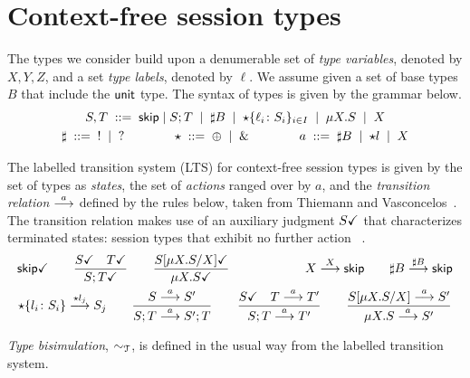\section{Context-free session types}
\label{sec:contextfreesession}

The types we consider build upon a denumerable set of \emph{type
  variables}, denoted by $X,Y,Z$, and a set \emph{type labels},
denoted by $\ell$. We assume given a set of base types $B$ that
include the $\unitk$ type. The syntax of types is given by the grammar
below.
%
\begin{gather*}
  S,T \grmeq \skipk \mid S;T \grmor \sharp B \grmor 
  \star\{\ell_i\colon S_i\}_{i\in I} \grmor \mu X.S \grmor X
  \\
  \sharp \grmeq {}! \grmor {}? 
  \qquad \qquad
  \star  \grmeq \oplus \grmor {}\&
  \qquad \qquad
  a \grmeq \sharp B \grmor \star l \grmor X
\end{gather*}

%
The labelled transition system (LTS) for context-free session types is
given by the set of types as \emph{states}, the set of \emph{actions}
ranged over by $a$, and the \emph{transition relation} $\LTSderives$
defined by the rules below, taken from Thiemann and
Vasconcelos~\cite{thiemann2016context}.
The transition relation makes
use of an auxiliary judgment $\DONE{S}$ that characterizes terminated
states: session types that exhibit no further
action~\cite{DBLP:journals/jacm/AcetoH92} .
%
  \begin{gather*}
    \DONE{\skipk}
    \qquad
    \frac{\DONE{S} \quad \DONE{T}}{\DONE{S; T}}
    \qquad
    \frac{\DONE{S[\mu X.S/X]}}{\DONE{\mu X.S}}
    \qquad\qquad\qquad
    X \LTSderives[X] \skipk
    \qquad
    \sharp B \LTSderives[\sharp B] \skipk
    \\
    \star\{l_i\colon S_i\} \LTSderives[\star l_j] S_j
    \qquad
    \frac{S \LTSderives S'}{S; T \LTSderives S';T}
    \qquad
    \frac{\DONE{S} \quad T \LTSderives T'}{S; T \LTSderives T'}
    \qquad
    \frac{S[\mu X.S/X] \LTSderives S'}{\mu X.S \LTSderives S'}
  \end{gather*}


\emph{Type bisimulation}, $\TypeEquiv$, is defined in the usual way from the
labelled transition system. 


